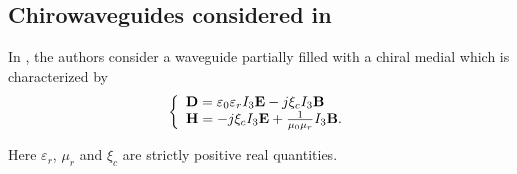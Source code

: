 \subsection{Chirowaveguides considered in \cite{wujaggard}}
In \cite{wujaggard}, the authors consider a waveguide partially filled with 
a chiral medial which is characterized by
\begin{equation}
\left\{
\begin{array}{ll}
{\bf D} = \varepsilon_0\varepsilon_r I_3 {\bf E} - j \xi_c I_3 {\bf B} \\
{\bf H} = -j\xi_c I_3 {\bf E} + \frac{1}{\mu_0\mu_r} I_3 {\bf B}.
\end{array}
\right.
\end{equation}

Here $\varepsilon_r$, $\mu_r$ and $\xi_c$ are strictly positive real quantities.

